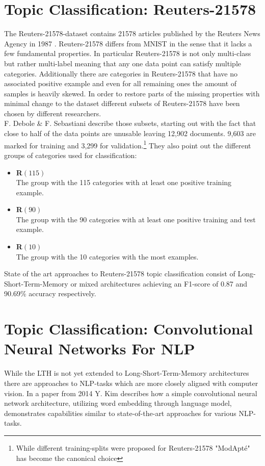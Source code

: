 \section{Topic Classification: Reuters-21578}
The Reuters-21578-dataset contains 21578 articles published by the Reuters News Agency in 1987 \cite{Reuters-21578}. Reuters-21578 differs from MNIST in the sense that it lacks a few fundamental properties. In particular Reuters-21578 is not only multi-class but rather multi-label meaning that any one data point can satisfy multiple categories. Additionally there are categories in Reuters-21578 that have no associated positive example and even for all remaining ones the amount of samples is heavily skewed. In order to restore parts of the missing properties with minimal change to the dataset different subsets of Reuters-21578 have been chosen by different researchers.\\
F. Debole \& F. Sebastiani \cite{Reuters-Subsets} describe those subsets, starting out with the fact that close to half of the data points are unusable leaving 12,902 documents. 9,603 are marked for training and 3,299 for validation.\footnote{While different training-splits were proposed for Reuters-21578 "ModApt\'e" has become the canonical choice} They also point out the different groups of categories used for classification:
\begin{itemize}
	\item \textbf{R$\left(115\right)$}\\
	The group with the 115 categories with at least one positive training example.\\ 
	\item \textbf{R$\left(90\right)$}\\
	The group with the 90 categories with at least one positive training and test example.\\ 
	\item \textbf{R$\left(10\right)$}\\
	The group with the 10 categories with the most examples. \\
\end{itemize} 
State of the art approaches to Reuters-21578 topic classification consist of Long-Short-Term-Memory \cite{Rethinking-LSTM} or mixed architectures \cite{RMDL} achieving an F1-score of 0.87 and 90.69\% accuracy respectively.

\section{Topic Classification: Convolutional Neural Networks For NLP}
While the LTH is not yet extended to Long-Short-Term-Memory architectures there are approaches to NLP-tasks  which are more closely aligned with computer vision. In a paper from 2014 \cite{CNN-For-NLP} Y. Kim describes how a simple convolutional neural network architecture, utilizing word embedding through language model, demonstrates capabilities similar to state-of-the-art approaches for various NLP-tasks.

